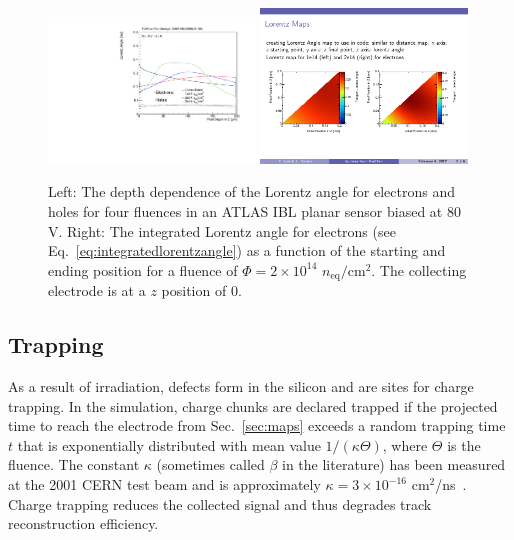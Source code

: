 \begin{figure}[htpb!]
\centering
\includegraphics[width=0.49\textwidth]{Angle_0fluence80V.pdf}
\includegraphics[width=0.49\textwidth]{Run2}
\caption{Left: The depth dependence of the Lorentz angle for electrons and holes for four fluences in an ATLAS IBL planar sensor biased at 80 V.  Right: The integrated Lorentz angle for electrons (see Eq.~\ref{eq:integratedlorentzangle}) as a function of the starting and ending position for a fluence of $\Phi=2\times10^{14}$ $n_\text{eq}/\text{cm}^2$.  The collecting electrode is at a $z$ position of $0$.}
\label{fig:lorentzangle:Run2}
\end{figure}


\subsection{Trapping}
\label{sec:chargetrapping}

As a result of irradiation, defects form in the silicon and are sites for charge trapping.  In the simulation, charge chunks are declared trapped if the projected time to reach the electrode from Sec.~\ref{sec:maps} exceeds a random trapping time $t$ that is exponentially distributed with mean value $1/(\kappa\Theta)$, where $\Theta$ is the fluence.  The constant $\kappa$ (sometimes called $\beta$ in the literature) has been measured at the 2001 CERN test beam and is approximately $\kappa=3\times 10^{-16}$ cm${}^2$/ns~\cite{trapping2}.  Charge trapping reduces the collected signal and thus degrades track reconstruction efficiency.

